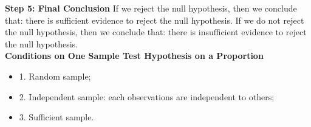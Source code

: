 \textbf{Step 5: Final Conclusion}
If we reject the null hypothesis, then we conclude that: there is sufficient evidence to reject the null hypothesis. If we do not reject the null hypothesis, then we conclude that: there is insufficient evidence to reject the null hypothesis.\\

\textbf{Conditions on One Sample Test Hypothesis on a Proportion}
\begin{itemize}
	\item 1. Random sample;
	\item 2. Independent sample: each observations are independent to others;
	\item 3. Sufficient sample.
\end{itemize}









